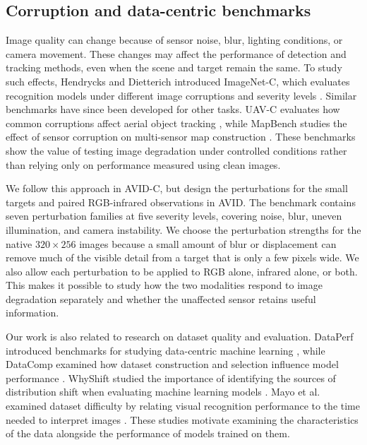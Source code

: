\documentclass[10pt]{article}
\newcommand{\dataset}{\textsc{AVID}}
\newcommand{\corrupt}{\textsc{AVID-C}}
\begin{document}
\subsection{Corruption and data-centric benchmarks}

Image quality can change because of sensor noise, blur, lighting conditions, or camera movement. These changes may affect the performance of detection and tracking methods, even when the scene and target remain the same. To study such effects, Hendrycks and Dietterich introduced ImageNet-C, which evaluates recognition models under different image corruptions and severity levels \citep{hendrycks2019benchmarking}. Similar benchmarks have since been developed for other tasks. UAV-C evaluates how common corruptions affect aerial object tracking \citep{liu2024uavc}, while MapBench studies the effect of sensor corruption on multi-sensor map construction \citep{hao2024mapbench}. These benchmarks show the value of testing image degradation under controlled conditions rather than relying only on performance measured using clean images.

We follow this approach in \corrupt{}, but design the perturbations for the small targets and paired RGB-infrared observations in \dataset{}. The benchmark contains seven perturbation families at five severity levels, covering noise, blur, uneven illumination, and camera instability. We choose the perturbation strengths for the native $320\times256$ images because a small amount of blur or displacement can remove much of the visible detail from a target that is only a few pixels wide. We also allow each perturbation to be applied to RGB alone, infrared alone, or both. This makes it possible to study how the two modalities respond to image degradation separately and whether the unaffected sensor retains useful information.

Our work is also related to research on dataset quality and evaluation. DataPerf introduced benchmarks for studying data-centric machine learning \citep{mazumder2023dataperf}, while DataComp examined how dataset construction and selection influence model performance \citep{gadre2023datacomp}. WhyShift studied the importance of identifying the sources of distribution shift when evaluating machine learning models \citep{liu2023whyshift}. Mayo et al. examined dataset difficulty by relating visual recognition performance to the time needed to interpret images \citep{mayo2023difficulty}. These studies motivate examining the characteristics of the data alongside the performance of models trained on them.
\end{document}
